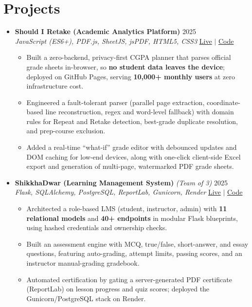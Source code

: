 \documentclass[a4paper]{article}
\newcommand{\resumeItem}[1]{
  \item\small{
    {#1 \vspace{-2pt}}
  }
}
\newcommand{\resumeItemListStart}{\begin{itemize}}
\newcommand{\resumeItemListEnd}{\end{itemize}\vspace{-5pt}}
\begin{document}
\section{Projects}
  \begin{itemize}[leftmargin=0.15in, label={}, itemsep=6pt]

    \item
    \textbf{Should I Retake (Academic Analytics Platform)} \hfill 2025\\
    \small\textit{JavaScript (ES6+), PDF.js, SheetJS, jsPDF, HTML5, CSS3} \hfill
    \href{https://badhon495.github.io/should-i-retake/}{Live} $|$
    \href{https://github.com/badhon495/should-i-retake}{Code}
    \vspace{-5pt}
    \resumeItemListStart
      \resumeItem{Built a zero-backend, privacy-first CGPA planner that parses official grade sheets in-browser, so \textbf{no student data leaves the device}; deployed on GitHub Pages, serving \textbf{10,000+ monthly users} at zero infrastructure cost.}
      \resumeItem{Engineered a fault-tolerant parser (parallel page extraction, coordinate-based line reconstruction, regex and word-level fallback) with domain rules for Repeat and Retake detection, best-grade duplicate resolution, and prep-course exclusion.}
      \resumeItem{Added a real-time ``what-if'' grade editor with debounced updates and DOM caching for low-end devices, along with one-click client-side Excel export and generation of multi-page, watermarked PDF grade sheets.}
    \resumeItemListEnd

    \item
    \textbf{ShikkhaDwar (Learning Management System)} \textit{\small (Team of 3)} \hfill 2025\\
    \small\textit{Flask, SQLAlchemy, PostgreSQL, ReportLab, Gunicorn, Render} \hfill
    \href{https://shikkhadwar-81r2.onrender.com/}{Live} $|$
    \href{https://github.com/nihal-kabir/ShikkhaDwar}{Code}
    \vspace{-5pt}
    \resumeItemListStart
      \resumeItem{Architected a role-based LMS (student, instructor, admin) with \textbf{11 relational models} and \textbf{40+ endpoints} in modular Flask blueprints, using hashed credentials and ownership checks.}
      \resumeItem{Built an assessment engine with MCQ, true/false, short-answer, and essay questions, featuring auto-grading, attempt limits, passing scores, and an instructor manual-grading gradebook.}
      \resumeItem{Automated certification by gating a server-generated PDF certificate (ReportLab) on lesson progress and quiz scores; deployed the Gunicorn/PostgreSQL stack on Render.}
    \resumeItemListEnd


\end{itemize}
\end{document}
